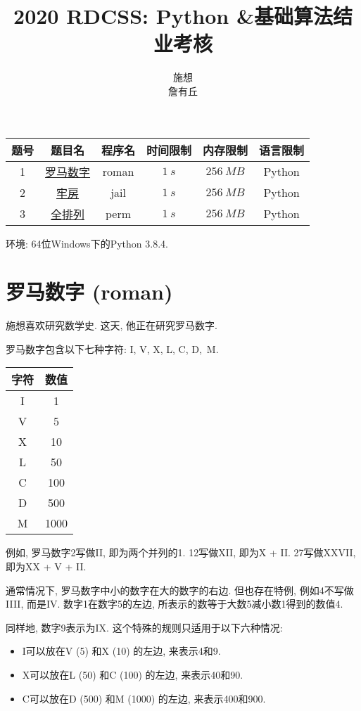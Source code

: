 \documentclass{article}
\title{2020 RDCSS: Python \&基础算法结业考核}
\author{施想\\詹有丘}
\begin{document}
\maketitle

\begin{table}[h!]
\centering
\begin{tabular}{cccccc}
题号 & 题目名 & 程序名 & 时间限制 & 内存限制 & 语言限制\\
\hline
1 & \hyperlink{section.1}{罗马数字} & roman & $\SI{1}{s}$ & $\SI{256}{MB}$ & Python\\
2 & \hyperlink{section.2}{牢房} & jail & $\SI{1}{s}$ & $\SI{256}{MB}$ & Python\\
3 & \hyperlink{section.3}{全排列} & perm & $\SI{1}{s}$ & $\SI{256}{MB}$ & Python\\
\end{tabular}
\end{table}

环境: 64位Windows下的Python 3.8.4.

\section{罗马数字 (roman)}
\label{sec:roman}

施想喜欢研究数学史.
这天, 他正在研究罗马数字.

罗马数字包含以下七种字符: I, V, X, L, C, D, M.

\begin{table}[h!]
\centering
\begin{tabular}{cc}
字符 & 数值\\
\hline
I & 1\\
V & 5\\
X & 10\\
L & 50\\
C & 100\\
D & 500\\
M & 1000
\end{tabular}
\end{table}

例如, 罗马数字2写做II, 即为两个并列的1.
12写做XII, 即为X + II. 
27写做XXVII, 即为XX + V + II.

通常情况下, 罗马数字中小的数字在大的数字的右边.
但也存在特例, 例如4不写做IIII, 而是IV.
数字1在数字5的左边, 所表示的数等于大数5减小数1得到的数值4.

同样地, 数字9表示为IX. 这个特殊的规则只适用于以下六种情况:
\begin{itemize}
\item I可以放在V (5) 和X (10) 的左边, 来表示4和9.
\item X可以放在L (50) 和C (100) 的左边, 来表示40和90.
\item C可以放在D (500) 和M (1000) 的左边, 来表示400和900.
\end{itemize}
\end{document}
